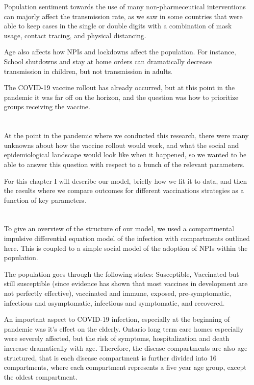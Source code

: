 \documentclass{article}
\begin{document}
Population sentiment towards the use of many non-pharmeceutical interventions can majorly affect the transmission rate, as we saw in some countries that were able to keep cases in the single or double digits with a combination of mask usage, contact tracing, and physical distancing.


Age also affects how NPIs and lockdowns affect the population. For instance, School shutdowns and stay at home orders can dramatically decrease transmission in children, but not transmission in adults.  

The COVID-19 vaccine rollout has already occurred, but at this point in the pandemic it was far off on the horizon, and the question was how to prioritize groups receiving the vaccine.


\section{}

At the point in the pandemic where we conducted this research, there were many unknowns about how the vaccine rollout would work, and what the social and epidemiological landscape would look like when it happened, so we wanted to be able to answer this question with respect to a bunch of the relevant parameters.


For this chapter I will describe our model, briefly how we fit it to data, and then the results where we compare outcomes for different vaccinations strategies as a function of key parameters.



\section{}

To give an overview of the structure of our model, we used a compartmental impulsive differential equation model of the infection with compartments outlined here. This is coupled to a simple social model of the adoption of NPIs within the population.

The population goes through the following states: Susceptible, Vaccinated but still susceptible (since evidence has shown that most vaccines in development are not perfectly effective), vaccinated and immune, exposed, pre-symptomatic, infectious and asymptomatic, infectious and symptomatic, and recovered. 


An important aspect to COVID-19 infection, especially at the beginning of pandemic was it's effect on the elderly. Ontario long term care homes especially were severely affected, but the risk of symptoms, hospitalization and death increase dramatically with age. Therefore, the disease compartments are also age structured, that is each disease compartment is further divided into 16 compartments, where each compartment represents a five year age group, except the oldest compartment.
\end{document}
